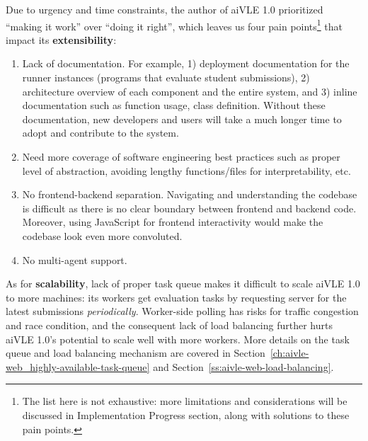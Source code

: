 Due to urgency and time constraints, the author of aiVLE 1.0 prioritized “making it work” over “doing it right”, which leaves us four pain points\footnote{The list here is not exhaustive: more limitations and considerations will be discussed in Implementation Progress section, along with solutions to these pain points.} that impact its \textbf{extensibility}:

\begin{enumerate}
    \item Lack of documentation. For example, 1) deployment documentation for the runner instances (programs that evaluate student submissions), 2) architecture overview of each component and the entire system, and 3) inline documentation such as function usage, class definition. Without these documentation, new developers and users will take a much longer time to adopt and contribute to the system. 
    \item Need more coverage of software engineering best practices such as proper level of abstraction, avoiding lengthy functions/files for interpretability, etc.
    \item No frontend-backend separation. Navigating and understanding the codebase is difficult as there is no clear boundary between frontend and backend code. Moreover, using JavaScript for frontend interactivity would make the codebase look even more convoluted.
    \item No multi-agent support.
\end{enumerate}

As for \textbf{scalability}, lack of proper task queue makes it difficult to scale aiVLE 1.0 to more machines: its workers get evaluation tasks by requesting server for the latest submissions \textit{periodically}. Worker-side polling has risks for traffic congestion and race condition, and the consequent lack of load balancing further hurts aiVLE 1.0’s potential to scale well with more workers. More details on the task queue and load balancing mechanism are covered in Section~\ref{ch:aivle-web_highly-available-task-queue} and Section~\ref{ss:aivle-web-load-balancing}.